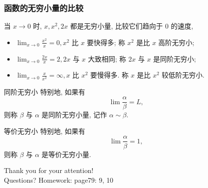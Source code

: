 \documentclass[
10pt, 
aspectratio=43, 
]{beamer}
\begin{document}
\begin{frame}
\frametitle{函数的无穷小量的比较}
当 $x\to0$ 时,  $x,  x^2,  2 x$ 都是无穷小量,  比较它们趋向于 0 的速度, 
\begin{itemize}
\item $\lim _{x \rightarrow 0} \frac{x^2}{x}=0,  x^2$ 比 $x$ 要快得多; 称 $x^2$ 是比 $x$ 高阶无穷小;
\item $\lim _{x \rightarrow 0} \frac{2 x}{x}=2, 2 x$ 与 $x$ 大致相同; 称 $2 x$ 与 $x$ 是同阶无穷小;
\item $\lim _{x \rightarrow 0} \frac{x}{x^2}=\infty,  x$ 比 $x^2$ 要慢得多. 称 $x$ 是比 $x^2$ 较低阶无穷小. 
\end{itemize}
\pause
\begin{block}{同阶无穷小}
特别地, 如果有
$$
\lim \frac{\alpha}{\beta} = L, 
$$
则称 $\beta$ 与 $\alpha$ 是同阶无穷小量, 记作 $\alpha \sim \beta$.
\end{block}
\pause
\begin{block}{等价无穷小}
特别地, 如果有
$$
\lim \frac{\alpha}{\beta} = 1, 
$$
则称 $\beta$ 与 $\alpha$ 是等价无穷小量.
\end{block}
\end{frame}



\begin{frame}[plain]
	\vfill
	\centering
	{
		\centering \Huge \color{white} Thank you for your attention!\\[10pt]Questions?
        Homework:  page79:  9,  10
	}
	\vfill
\end{frame}
\end{document}
